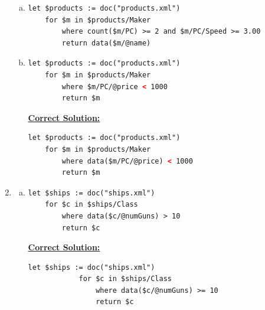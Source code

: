 \documentclass[12pt]{article}
\begin{document}
\begin{enumerate}[1.]
\begin{enumerate}[a)]
        \item

    \begin{lstlisting}[language=XML]
    let $products := doc("products.xml")
    for $m in $products/Maker
        where count($m/PC) >= 2 and $m/PC/Speed >= 3.00
        return data($m/@name)
    \end{lstlisting}

        \item

    \begin{lstlisting}[language=XML]
    let $products := doc("products.xml")
    for $m in $products/Maker
        where $m/PC/@price < 1000
        return $m
    \end{lstlisting}

        \bigskip

        \begin{mdframed}
            \underline{\textbf{Correct Solution:}}

    \begin{lstlisting}[language=XML]
    let $products := doc("products.xml")
    for $m in $products/Maker
        where data($m/PC/@price) < 1000
        return $m
    \end{lstlisting}

        \end{mdframed}

    \end{enumerate}

    \item

    \begin{enumerate}[a)]
        \item

    \begin{lstlisting}[language=XML]
    let $ships := doc("ships.xml")
    for $c in $ships/Class
        where data($c/@numGuns) > 10
        return $c
    \end{lstlisting}

        \begin{mdframed}
            \underline{\textbf{Correct Solution:}}

            \begin{lstlisting}[language=XML]
            let $ships := doc("ships.xml")
            for $c in $ships/Class
                where data($c/@numGuns) >= 10
                return $c
            \end{lstlisting}


\end{mdframed}
\end{enumerate}
\end{enumerate}
\end{document}
